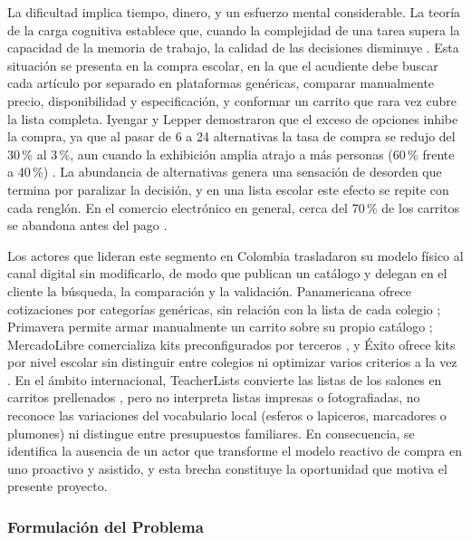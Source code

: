 La dificultad implica tiempo, dinero, y un esfuerzo
mental considerable. La teoría de la carga cognitiva establece que, cuando la complejidad de
una tarea supera la capacidad de la memoria de trabajo, la calidad de las decisiones
disminuye \citep{sweller_cognitive_2011}. Esta situación se presenta en la compra escolar,
en la que el acudiente debe buscar cada artículo por separado en plataformas genéricas,
comparar manualmente precio, disponibilidad y especificación, y conformar un carrito que
rara vez cubre la lista completa. Iyengar y Lepper demostraron que el exceso de opciones
inhibe la compra, ya que al pasar de 6 a 24 alternativas la tasa de compra se redujo del
30\,\% al 3\,\%, aun cuando la exhibición amplia atrajo a más personas (60\,\% frente a
40\,\%) \citep{iyengar_when_2000}. La abundancia de alternativas genera una sensación de desorden que termina por paralizar la decisión, y en una lista escolar este efecto se repite
con cada renglón. En el comercio electrónico en general, cerca del 70\,\% de los carritos se
abandona antes del pago \citep{noauthor_50_nodate}.\par

Los actores que lideran este segmento en Colombia trasladaron su modelo físico al canal
digital sin modificarlo, de modo que publican un catálogo y delegan en el cliente la
búsqueda, la comparación y la validación. Panamericana ofrece cotizaciones por categorías
genéricas, sin relación con la lista de cada colegio \citep{panamericana_cotizador_2025};
Primavera permite armar manualmente un carrito sobre su propio catálogo
\citep{primavera_armatulista_2026}; MercadoLibre comercializa kits preconfigurados por
terceros \citep{mercadolibre_kits_2025}, y Éxito ofrece kits por nivel escolar sin
distinguir entre colegios ni optimizar varios criterios a la vez
\citep{exito_listas_2025}. En el ámbito internacional, TeacherLists convierte las listas
de los salones en carritos prellenados \citep{teacherlists_retail_2026}, pero no interpreta listas impresas o fotografiadas, no
reconoce las variaciones del vocabulario local (esferos o lapiceros, marcadores o plumones)
ni distingue entre presupuestos familiares. En consecuencia, se identifica la ausencia de un actor que
transforme el modelo reactivo de compra en uno proactivo y asistido, y esta brecha
constituye la oportunidad que motiva el presente proyecto.\par

\subsubsection{Formulación del Problema}


